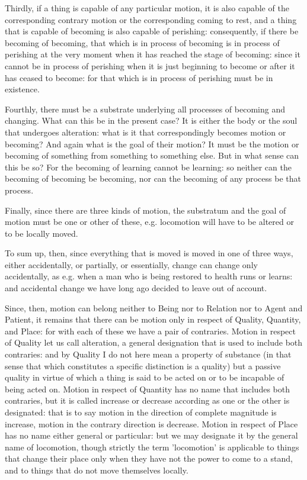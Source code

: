 Thirdly, if a thing is capable of any particular motion, it is also
capable of the corresponding contrary motion or the corresponding
coming to rest, and a thing that is capable of becoming is also capable
of perishing: consequently, if there be becoming of becoming, that
which is in process of becoming is in process of perishing at the
very moment when it has reached the stage of becoming: since it cannot
be in process of perishing when it is just beginning to become or
after it has ceased to become: for that which is in process of perishing
must be in existence. 

Fourthly, there must be a substrate underlying all processes of becoming
and changing. What can this be in the present case? It is either the
body or the soul that undergoes alteration: what is it that correspondingly
becomes motion or becoming? And again what is the goal of their motion?
It must be the motion or becoming of something from something to something
else. But in what sense can this be so? For the becoming of learning
cannot be learning: so neither can the becoming of becoming be becoming,
nor can the becoming of any process be that process. 

Finally, since there are three kinds of motion, the substratum and
the goal of motion must be one or other of these, e.g. locomotion
will have to be altered or to be locally moved. 

To sum up, then, since everything that is moved is moved in one of
three ways, either accidentally, or partially, or essentially, change
can change only accidentally, as e.g. when a man who is being restored
to health runs or learns: and accidental change we have long ago decided
to leave out of account. 

Since, then, motion can belong neither to Being nor to Relation nor
to Agent and Patient, it remains that there can be motion only in
respect of Quality, Quantity, and Place: for with each of these we
have a pair of contraries. Motion in respect of Quality let us call
alteration, a general designation that is used to include both contraries:
and by Quality I do not here mean a property of substance (in that
sense that which constitutes a specific distinction is a quality)
but a passive quality in virtue of which a thing is said to be acted
on or to be incapable of being acted on. Motion in respect of Quantity
has no name that includes both contraries, but it is called increase
or decrease according as one or the other is designated: that is to
say motion in the direction of complete magnitude is increase, motion
in the contrary direction is decrease. Motion in respect of Place
has no name either general or particular: but we may designate it
by the general name of locomotion, though strictly the term 'locomotion'
is applicable to things that change their place only when they have
not the power to come to a stand, and to things that do not move themselves
locally. 

